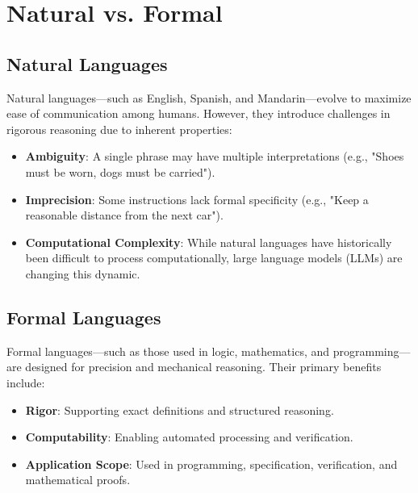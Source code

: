 \documentclass{book}
\providecommand{\tightlist}{%
  \setlength{\itemsep}{0pt}\setlength{\parskip}{0pt}}
\begin{document}
\hypertarget{pandoc.profile.debug__pandoc__debug__src__languages.md__natural-vs-formal}{%
\section*{Natural vs. Formal}\label{pandoc.profile.debug__pandoc__debug__src__languages.md__natural-vs-formal}}

\hypertarget{pandoc.profile.debug__pandoc__debug__src__languages.md__natural-languages}{%
\subsection*{Natural Languages}\label{pandoc.profile.debug__pandoc__debug__src__languages.md__natural-languages}}

Natural languages---such as English, Spanish, and Mandarin---evolve to maximize ease of communication among humans. However, they introduce challenges in rigorous reasoning due to inherent properties:

\begin{itemize}
\tightlist
\item
  \textbf{Ambiguity}: A single phrase may have multiple interpretations (e.g., "Shoes must be worn, dogs must be carried").
\item
  \textbf{Imprecision}: Some instructions lack formal specificity (e.g., "Keep a reasonable distance from the next car").
\item
  \textbf{Computational Complexity}: While natural languages have historically been difficult to process computationally, large language models (LLMs) are changing this dynamic.
\end{itemize}

\hypertarget{pandoc.profile.debug__pandoc__debug__src__languages.md__formal-languages}{%
\subsection*{Formal Languages}\label{pandoc.profile.debug__pandoc__debug__src__languages.md__formal-languages}}

Formal languages---such as those used in logic, mathematics, and programming---are designed for precision and mechanical reasoning. Their primary benefits include:

\begin{itemize}
\tightlist
\item
  \textbf{Rigor}: Supporting exact definitions and structured reasoning.
\item
  \textbf{Computability}: Enabling automated processing and verification.
\item
  \textbf{Application Scope}: Used in programming, specification, verification, and mathematical proofs.
\end{itemize}
\end{document}
